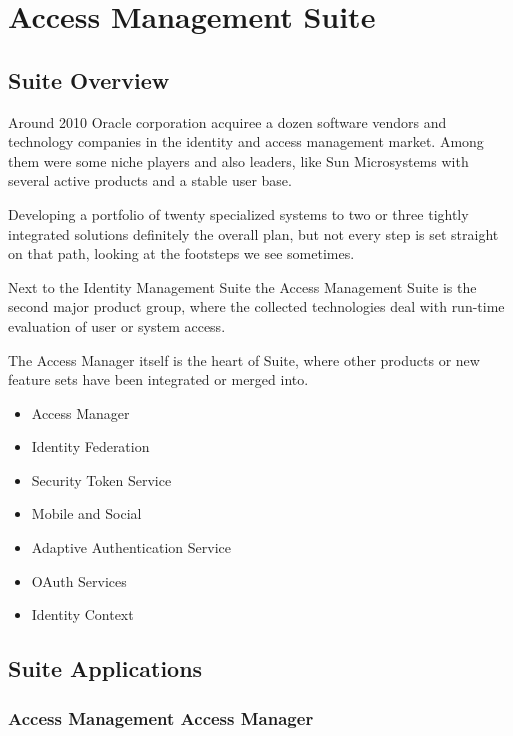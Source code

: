 
\chapter{Access Management Suite}

\section{Suite Overview}

Around 2010 Oracle corporation acquiree a dozen software vendors and
technology companies in the identity and access management market. Among
them were some niche players and also leaders, like Sun Microsystems
with several active products and a stable user base.

Developing a portfolio of twenty specialized systems to two or three
tightly integrated solutions definitely the overall plan, but not every
step is set straight on that path, looking at the footsteps we see
sometimes.

Next to the Identity Management Suite the Access Management Suite is the
second major product group, where the collected technologies deal with
run-time evaluation of user or system access.

The Access Manager itself is the heart of Suite, where other products or
new feature sets have been integrated or merged into.

\begin{itemize}
    \item Access Manager
    \item Identity Federation
    \item Security Token Service
    \item Mobile and Social
    \item Adaptive Authentication Service
    \item OAuth Services
    \item Identity Context
\end{itemize}



\section{Suite Applications}


\subsection{Access Management Access Manager}

